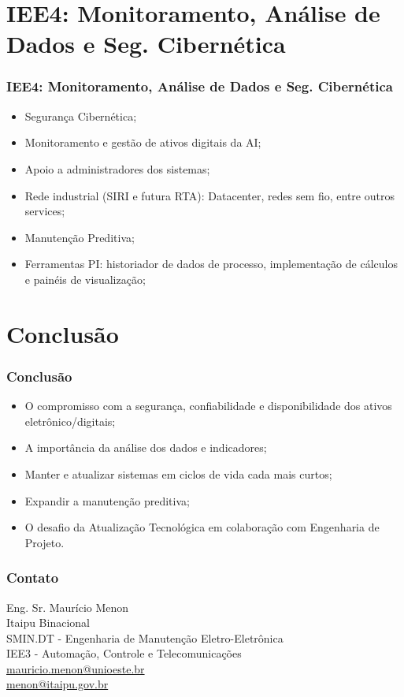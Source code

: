\documentclass{beamer}
\begin{document}
\section[IEE4]{IEE4: Monitoramento, Análise de Dados e Seg. Cibernética}
\begin{frame}
\frametitle{IEE4: Monitoramento, Análise de Dados e Seg. Cibernética}
\begin{itemize}
    \item Segurança Cibernética;
    \item Monitoramento e gestão de ativos digitais da AI;
    \item Apoio a administradores dos sistemas;
    \item Rede industrial (SIRI e futura RTA): Datacenter, redes sem fio, entre outros services;
    \item Manutenção Preditiva;
    \item Ferramentas PI: historiador de dados de processo, implementação de cálculos e painéis de visualização;
\end{itemize}
\end{frame}

\section[Conclusão]{Conclusão}
\begin{frame}
\frametitle{Conclusão}
\begin{itemize}
    \item O compromisso com a segurança, confiabilidade e disponibilidade dos ativos eletrônico/digitais;
    \item A importância da análise dos dados e indicadores;
    \item Manter e atualizar sistemas em ciclos de vida cada mais curtos;
    \item Expandir a manutenção preditiva;
    \item O desafio da Atualização Tecnológica em colaboração com Engenharia de Projeto.
\end{itemize}
\end{frame}

\begin{frame}
\frametitle{Contato}
\centering
Eng. Sr. Maurício Menon \\
Itaipu Binacional\\
SMIN.DT - Engenharia de Manutenção Eletro-Eletrônica\\
IEE3 - Automação, Controle e Telecomunicações\\
\href{mailto:mauricio.menon@unioeste.br}{mauricio.menon@unioeste.br} \\
\href{mailto:menon@itaipu.gov.br}{menon@itaipu.gov.br}
\end{frame}
\end{document}
